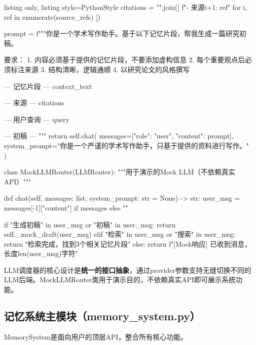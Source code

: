 \documentclass[12pt,a4paper,oneside]{article}
\begin{document}
\begin{tcblisting}{listing only, listing style=PythonStyle}
        citations = "\n".join([
            f"- 来源{i+1}: {ref}" for i, ref in enumerate(source_refs)
        ])

        prompt = f"""你是一个学术写作助手。基于以下记忆片段，帮我生成一篇研究初稿。

要求：
1. 内容必须基于提供的记忆片段，不要添加虚构信息
2. 每个重要观点后必须标注来源
3. 结构清晰，逻辑通顺
4. 以研究论文的风格撰写

--- 记忆片段 ---
{context_text}

--- 来源 ---
{citations}

--- 用户查询 ---
{query}

--- 初稿 ---
"""
        return self.chat(
            messages=[{"role": "user", "content": prompt}],
            system_prompt="你是一个严谨的学术写作助手，只基于提供的资料进行写作。"
        )


class MockLLMRouter(LLMRouter):
    """用于演示的Mock LLM（不依赖真实API）"""

    def chat(self, messages: list, system_prompt: str = None) -> str:
        user_msg = messages[-1]["content"] if messages else ""

        if "生成初稿" in user_msg or "初稿" in user_msg:
            return self._mock_draft(user_msg)
        elif "检索" in user_msg or "搜索" in user_msg:
            return "检索完成，找到3个相关记忆片段"
        else:
            return f"[Mock响应] 已收到消息，长度{len(user_msg)}字符"
\end{tcblisting}

LLM调度器的核心设计是\textbf{统一的接口抽象}，通过provider参数支持无缝切换不同的LLM后端。MockLLMRouter类用于演示目的，不依赖真实API即可展示系统功能。

\subsection{记忆系统主模块（memory\_system.py）}

MemorySystem是面向用户的顶层API，整合所有核心功能。
\end{document}
